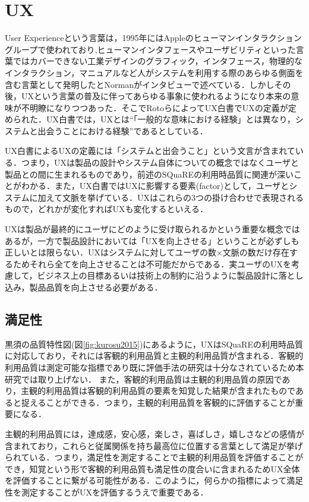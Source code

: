 \section{UX}

User Experienceという言葉は，1995年にはAppleのヒューマンインタラクショングループで使われており\cite{norman1995},ヒューマンインタフェースやユーザビリティといった言葉ではカバーできない工業デザインのグラフィック，インタフェース，物理的なインタラクション，マニュアルなど人がシステムを利用する際のあらゆる側面を含む言葉として発明したとNormanがインタビューで述べている\cite{normaninterview}．しかしその後，UXという言葉の普及に伴ってあらゆる事象に使われるようになり本来の意味が不明瞭になりつつあった．そこでRotoらによってUX白書でUXの定義が定められた．UX白書では，UXとは``「一般的な意味における経験」とは異なり，システムと出会うことにおける経験''であるとしている\cite{uxwhitepaper}．

UX白書によるUXの定義には「システムと出会うこと」という文言が含まれている．つまり，UXは製品の設計やシステム自体についての概念ではなくユーザと製品との間に生まれるものであり，前述のSQuaREの利用時品質に関連が深いことがわかる．また，UX白書ではUXに影響する要素(factor)として，ユーザとシステムに加えて文脈を挙げている\cite{uxwhitepaper}．UXはこれらの3つの掛け合わせで表現されるもので，どれかが変化すればUXも変化するといえる．

UXは製品が最終的にユーザにどのように受け取られるかという重要な概念ではあるが，一方で製品設計においては「UXを向上させる」ということが必ずしも正しいとは限らない．UXはシステムに対してユーザの数×文脈の数だけ存在するためそれら全てを向上させることは不可能だからである．実ユーザのUXを考慮して，ビジネス上の目標あるいは技術上の制約に沿うように製品設計に落とし込み，製品品質を向上させる必要がある．

\subsection{満足性}

黒須の品質特性図(図\ref{fig:kurosu2015})にあるように，UXはSQuaREの利用時品質に対応しており，それには客観的利用品質と主観的利用品質が含まれる．客観的利用品質は測定可能な指標であり既に評価手法の研究は十分なされているため本研究では取り上げない．
また，客観的利用品質は主観的利用品質の原因であり，主観的利用品質は客観的利用品質の要素を知覚した結果が含まれたものであると捉えることができる．つまり，主観的利用品質を客観的に評価することが重要になる．

主観的利用品質には，達成感，安心感，楽しさ，喜ばしさ，嬉しさなどの感情が含まれており，これらと従属関係を持ち最高位に位置する言葉として満足が挙げられている\cite{kurosu2011}．つまり，満足性を測定することで主観的利用品質を評価することができ，知覚という形で客観的利用品質も満足性の度合いに含まれるためUX全体を評価することに繋がる可能性がある．このように，何らかの指標によって満足性を測定することがUXを評価するうえで重要である．

